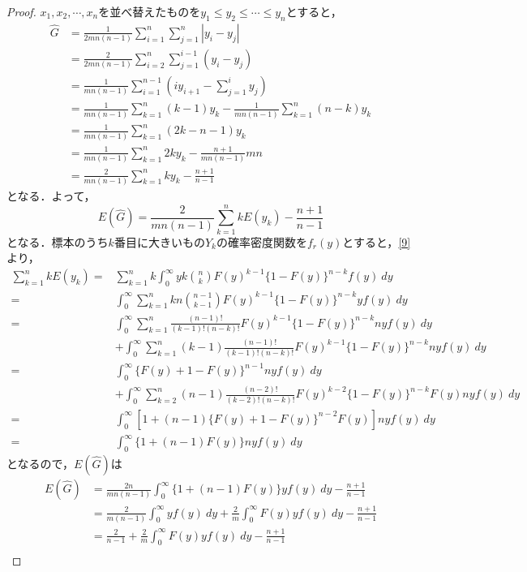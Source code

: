 \documentclass{jsarticle}
\begin{document}
\begin{proof}
$x_1,x_2,\dotsb,x_n$を並べ替えたものを$y_1\leq y_2\leq \dotsb \leq y_n$とすると，
\begin{align*}
\hat{G} &=\frac{1}{2mn(n-1)} \sum_{i=1}^n \sum_{j=1}^n |y_i-y_j| \\
&=\frac{2}{2mn(n-1)} \sum_{i=2}^n \sum_{j=1}^{i-1} (y_i-y_j) \\
&=\frac{1}{mn(n-1)} \sum_{i=1}^{n-1} (iy_{i+1}-\sum_{j=1}^i y_j) \\
&=\frac{1}{mn(n-1)} \sum_{k=1}^n (k-1)y_k -\frac{1}{mn(n-1)} \sum_{k=1}^n (n-k)y_k \\
&=\frac{1}{mn(n-1)} \sum_{k=1}^n (2k-n-1)y_k \\
&=\frac{1}{mn(n-1)} \sum_{k=1}^n 2ky_k-\frac{n+1}{mn(n-1)}mn \\
&=\frac{2}{mn(n-1)} \sum_{k=1}^n ky_k-\frac{n+1}{n-1}
\end{align*}
となる．よって，
\[ E(\hat{G})=\frac{2}{mn(n-1)} \sum_{k=1}^n kE(y_k)-\frac{n+1}{n-1} \]
となる．標本のうち$k$番目に大きいもの$Y_k$の確率密度関数を$f_r(y)$とすると，\eqref{9}より，
\begin{align*}
\sum_{k=1}^n kE(y_k) =&\sum_{k=1}^n k\int_0^{\infty} y k\binom{n}{k}F(y)^{k-1}\{1-F(y)\}^{n-k}f(y)\ dy \\
=&\int_0^{\infty} \sum_{k=1}^n kn\binom{n-1}{k-1}F(y)^{k-1}\{1-F(y)\}^{n-k}yf(y)\ dy \\
=&\int_0^{\infty} \sum_{k=1}^n \frac{(n-1)!}{(k-1)!(n-k)!} F(y)^{k-1}\{1-F(y)\}^{n-k}nyf(y)\ dy \\
 &+\int_0^{\infty} \sum_{k=1}^n (k-1)\frac{(n-1)!}{(k-1)!(n-k)!}F(y)^{k-1}\{1-F(y)\}^{n-k}nyf(y)\ dy \\
=&\int_0^{\infty} \{ F(y)+1-F(y)\}^{n-1}nyf(y)\ dy \\
 &+\int_0^{\infty} \sum_{k=2}^n (n-1)\frac{(n-2)!}{(k-2)!(n-k)!}F(y)^{k-2}\{1-F(y)\}^{n-k} F(y)nyf(y)\ dy \\
=&\int_0^{\infty} [1+(n-1)\{F(y)+1-F(y)\}^{n-2}F(y)]nyf(y)\ dy \\
=&\int_0^{\infty} \{1+(n-1)F(y)\} nyf(y)\ dy
\end{align*}
となるので，$E(\hat{G})$は
\begin{align*}
E(\hat{G}) &=\frac{2n}{mn(n-1)} \int_0^{\infty} \{1+(n-1)F(y)\}yf(y)\ dy-\frac{n+1}{n-1} \\
&=\frac{2}{m(n-1)} \int_0^{\infty} yf(y)\ dy+\frac{2}{m} \int_0^{\infty} F(y)yf(y)\ dy-\frac{n+1}{n-1} \\
&=\frac{2}{n-1} +\frac{2}{m} \int_0^{\infty} F(y)yf(y)\ dy-\frac{n+1}{n-1} \\

\end{align*}
\end{proof}
\end{document}
